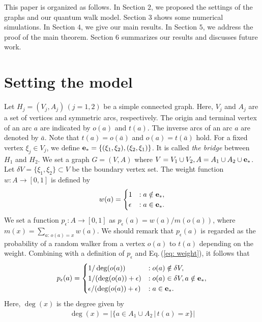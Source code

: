 \documentclass[12pt]{article}
\numberwithin{lemma}{section}
\numberwithin{proposition}{section}
\numberwithin{remark}{section}
\numberwithin{definition}{section}
\begin{document}
    This paper is organized as follows. In Section $2$, we proposed the settings of the graphs and our quantum walk model. Section $3$ shows some numerical simulations. In Section $4$, we give our main results. In Section $5$, we address the proof of the main theorem. Section $6$ summarizes our results and discusses future work.
\section{Setting the model}
 Let $H_j=(V_j, A_j) \,(j=1,2)$ be a simple connected graph. Here, $V_j$ and $A_j$ are a set of vertices and symmetric arcs, respectively. The origin and terminal vertex of an arc $a$ are indicated by $o(a)$ and $t(a)$. The inverse arcs of an arc $a$ are denoted by $\bar{a}$. Note that $t(a)=o(\bar{a})$ and $o(a)=t(\bar{a})$ hold. 
 For a fixed vertex $\xi_j \in V_j$, we define $\bold{e}_{*}=\{(\xi_1, \xi_2), (\xi_2, \xi_1)\}$. It is called {\it the bridge} between $H_1$ and $H_2$.
 We set a graph $G=(V,A)$ where $V=V_1 \cup V_2, A=A_1 \cup A_2 \cup \bold{e_*}$. Let $\delta V=\{\xi_1, \xi_2\} \subset V$ be the boundary vertex set.
The weight function $w: {A} \rightarrow [0, 1]$ is defined by
\begin{align}
    \label{eq: weight}
    w(a)=
    \begin{cases}
        1 &: a \notin \bold{e}_*, \\
        \epsilon &: a \in \bold{e}_*.
    \end{cases}
\end{align}
We set a function $p_{\epsilon}: {A} \rightarrow [0, 1]$ as $p_{\epsilon}(a)=w(a)/m(o(a))$,
where $m(x)= \sum_{a:\, o(a)=x} w(a)$.
We should remark that $p_{\epsilon}(a)$ is regarded as the probability of a random walker from a vertex $o(a)$ to $t(a)$ depending on the weight.
Combining with a definition of $p_{\epsilon}$ and Eq.\,(\ref{eq: weight}), it follows that 
 \begin{align}\label{eq:pe}
     p_{\epsilon}(a)=
     \begin{cases}
         1/\deg(o(a)) &: o(a) \notin \delta V, \\
         1/(\deg(o(a))+\epsilon) &: o(a) \in \delta V, a \notin \bold{e}_*, \\
         \epsilon/(\deg(o(a))+\epsilon) &: a \in \bold{e}_*.
     \end{cases}
 \end{align}
Here, $\deg(x)$ is the degree given by
\begin{align*}
    \deg (x)=\left|\{a \in A_{1} \cup A_{2}\,|\, t(a) =x \}\right|
\end{align*}
\end{document}
